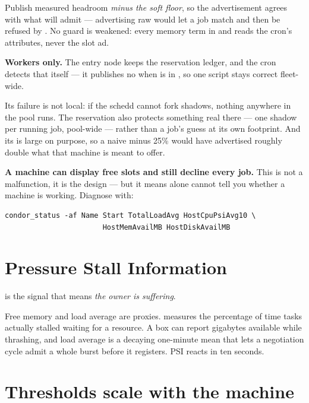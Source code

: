 Publish measured headroom \emph{minus the soft floor}, so the advertisement
agrees with what  will admit --- advertising raw 
would let a job match and then be refused by . No guard is
weakened: every memory term in  and  reads the cron's
 attributes, never the slot ad.

\begin{keypoint}
\textbf{Workers only.} The entry node keeps the reservation ledger, and the
cron detects that itself --- it publishes no  when  is in
, so one script stays correct fleet-wide.

Its failure is not local: if the schedd cannot fork shadows, nothing anywhere in
the pool runs. The reservation also protects something real there --- one shadow
per running job, pool-wide --- rather than a job's guess at its own footprint.
And its  is large on purpose, so a naive
 minus 25\% would have advertised roughly double what that
machine is meant to offer.
\end{keypoint}

\begin{trap}
\textbf{A machine can display free slots and still decline every job.} This is
not a malfunction, it is the design --- but it means  alone
cannot tell you whether a machine is working. Diagnose with:

\begin{lstlisting}[style=term]
condor_status -af Name Start TotalLoadAvg HostCpuPsiAvg10 \
                       HostMemAvailMB HostDiskAvailMB
\end{lstlisting}
\end{trap}

\section{Pressure Stall Information}

 is the signal that means \emph{the owner is suffering}.

Free memory and load average are proxies.  measures the
percentage of time tasks actually stalled waiting for a resource. A box can
report gigabytes available while thrashing, and load average is a decaying
one-minute mean that lets a negotiation cycle admit a whole burst before it
registers. PSI \kn{avg10} reacts in ten seconds.

\section{Thresholds scale with the machine}

